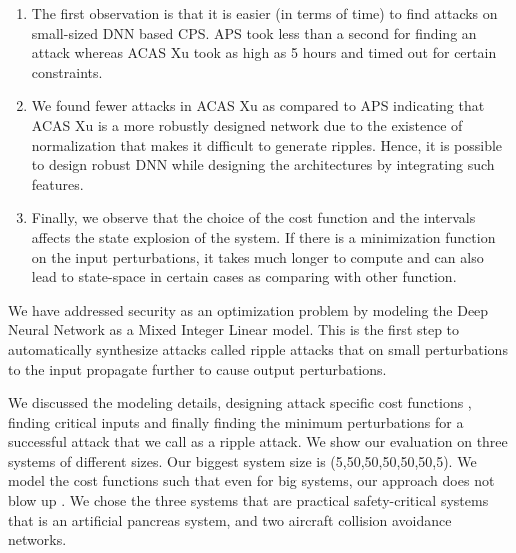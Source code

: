 \begin{enumerate}
	\item The first observation is that it is easier (in terms of time) to find attacks on small-sized DNN based CPS. 
	APS took less than a second for finding an attack whereas ACAS Xu took as high as 5 hours and timed out for certain constraints. 
	
	\item We found fewer attacks in ACAS Xu as compared to APS indicating  that ACAS Xu is a more robustly designed network due to the existence of normalization that makes it difficult to generate ripples. 
	Hence, it is possible to design robust \ac{DNN} while designing the architectures by integrating such features.  
	
	\item Finally, we observe that the choice of the cost function and the intervals affects the state explosion of the system. 
	If there is a minimization function on the input perturbations, it takes much longer to compute and can also lead to state-space  in certain cases as comparing with other function.  
\end{enumerate}




\iffalse
We have addressed security as an optimization problem by modeling the Deep Neural Network as a Mixed Integer Linear model. This is the first step to automatically synthesize attacks called ripple attacks that on small perturbations to the input propagate further to cause output perturbations. 

We discussed the modeling details, designing attack specific cost functions , finding critical inputs and finally finding the minimum perturbations for a successful attack that we call as a ripple attack. We show our evaluation on three systems of different sizes. Our biggest system size is (5,50,50,50,50,50,5). We model the cost functions such that even for big systems, our approach does not blow up . We chose the three systems that are practical safety-critical systems that is an artificial pancreas system, and two aircraft collision avoidance networks.

